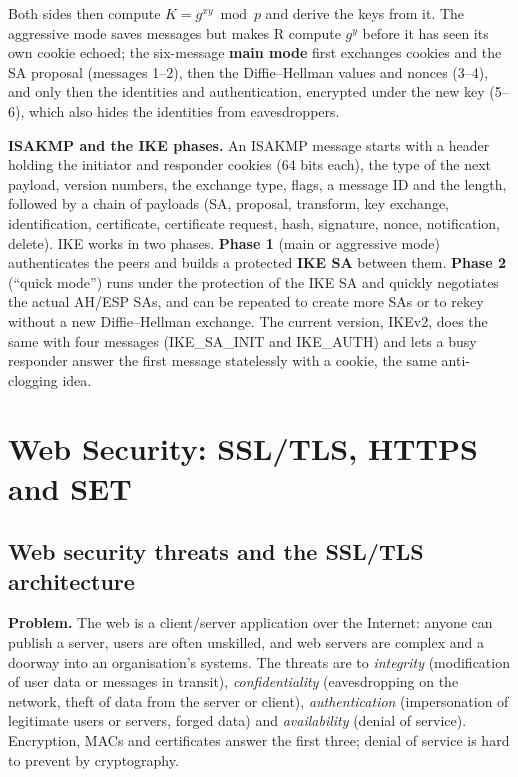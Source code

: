 Both sides then compute $K = g^{xy} \bmod p$ and derive the keys from it. The aggressive mode saves messages but makes R compute $g^y$ before it has seen its own cookie echoed; the six-message \textbf{main mode} first exchanges cookies and the SA proposal (messages 1--2), then the Diffie--Hellman values and nonces (3--4), and only then the identities and authentication, encrypted under the new key (5--6), which also hides the identities from eavesdroppers.

\textbf{ISAKMP and the IKE phases.} An ISAKMP message starts with a header holding the initiator and responder cookies (64 bits each), the type of the next payload, version numbers, the exchange type, flags, a message ID and the length, followed by a chain of payloads (SA, proposal, transform, key exchange, identification, certificate, certificate request, hash, signature, nonce, notification, delete). IKE works in two phases. \textbf{Phase 1} (main or aggressive mode) authenticates the peers and builds a protected \textbf{IKE SA} between them. \textbf{Phase 2} (``quick mode'') runs under the protection of the IKE SA and quickly negotiates the actual AH/ESP SAs, and can be repeated to create more SAs or to rekey without a new Diffie--Hellman exchange. The current version, IKEv2, does the same with four messages (IKE\_SA\_INIT and IKE\_AUTH) and lets a busy responder answer the first message statelessly with a cookie, the same anti-clogging idea.

\section{Web Security: SSL/TLS, HTTPS and SET}\label{sec:tls}

\subsection{Web security threats and the SSL/TLS architecture \hot\new}

\textbf{Problem.} The web is a client/server application over the Internet: anyone can publish a server, users are often unskilled, and web servers are complex and a doorway into an organisation's systems. The threats are to \emph{integrity} (modification of user data or messages in transit), \emph{confidentiality} (eavesdropping on the network, theft of data from the server or client), \emph{authentication} (impersonation of legitimate users or servers, forged data) and \emph{availability} (denial of service). Encryption, MACs and certificates answer the first three; denial of service is hard to prevent by cryptography.

